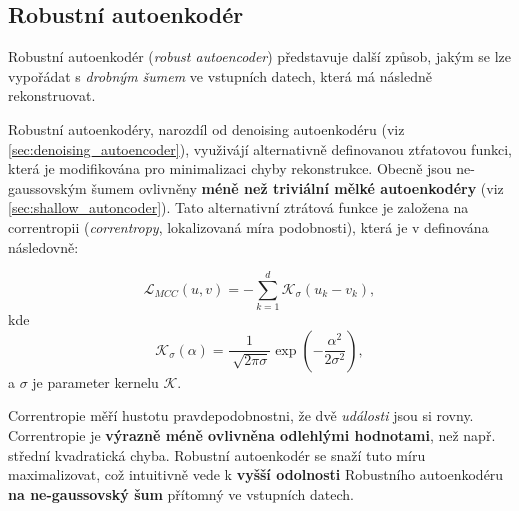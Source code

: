 \subsection{Robustní autoenkodér}
Robustní autoenkodér (\emph{robust autoencoder}) představuje další způsob, jakým se lze vypořádat s \emph{drobným šumem} ve vstupních datech, která má následně rekonstruovat.


Robustní autoenkodéry, narozdíl od denoising autoenkodéru (viz \autoref{sec:denoising_autoencoder}), využivájí alternativně definovanou ztŕatovou funkci, která je modifikována pro minimalizaci chyby rekonstrukce.
Obecně jsou ne-gaussovským šumem ovlivněny \textbf{méně než triviální mělké autoenkodéry} (viz \autoref{sec:shallow_autoncoder}).
Tato alternativní ztrátová funkce je založena na correntropii (\emph{correntropy}, lokalizovaná míra podobnosti), která je v \cite{Liu2006} definována následovně:

\begin{equation}
    \mathcal{L}_{MCC}(u, v) = -\sum_{k=1}^{d} \mathcal{K}_\sigma(u_k - v_k),
\end{equation}
kde
\begin{equation}
    \mathcal{K}_\sigma(\alpha) = \frac{1}{\sqrt[]{2\pi\sigma}}\exp(-\frac{\alpha^2}{2\sigma^2}),
\end{equation}
a $\sigma$ je parameter kernelu $\mathcal{K}$.

Correntropie měří hustotu pravdepodobnostni, že dvě \emph{události} jsou si rovny.
Correntropie je \textbf{výrazně méně ovlivněna odlehlými hodnotami}, než např. střední kvadratická chyba. \cite{Liu2006}
Robustní autoenkodér se snaží tuto míru maximalizovat, což intuitivně vede k \textbf{vyšší odolnosti} Robustního autoenkodéru \textbf{na ne-gaussovský šum} přítomný ve vstupních datech. \cite{Charte2018}
